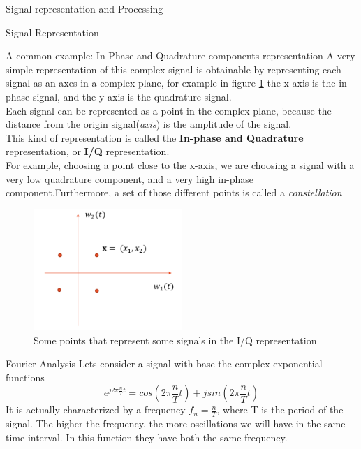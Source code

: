 \begin{section}{Signal representation and Processing}
\begin{subsection}{Signal Representation}
\begin{subsubsection}{A common example: In Phase and Quadrature components representation}
      A very simple representation of this complex signal is obtainable by representing each signal 
      as an axes in a complex plane, for example in figure \ref{fig:Complex Plane} the x-axis 
      is the in-phase signal, and the y-axis is the quadrature signal.\\
      Each signal can be represented as a point in the complex plane, because the distance from the
      origin signal(\textit{axis}) is the amplitude of the signal.\\
      This kind of representation is called the \textbf{In-phase and Quadrature} representation, or
      \textbf{I/Q} representation.\\
      For example, choosing a point close to the x-axis, we are choosing a signal with a very low
      quadrature component, and a very high in-phase component.Furthermore, a set of those 
      different points is called a \textit{constellation}\\
      \begin{figure}[h]
        \centering
        \includegraphics[width=0.5\textwidth]{img/wireless/iq representation.png}
        \caption{Some points that represent some signals in the I/Q representation}
        \label{fig:Complex Plane}
      \end{figure}
    \end{subsubsection}
  \end{subsection}
  \begin{subsection}{Fourier Analysis}
    Lets consider a signal with base the complex exponential functions 
    \begin{equation}
      e^{j2\pi \frac{n}{T} t} = cos(2\pi \frac{n}{T} t) + j sin(2\pi \frac{n}{T} t)
      \label{euler formula}
    \end{equation}
    It is actually characterized by a frequency $f_n = \frac{n}{T}$, where T is the period of the
    signal. The higher the frequency, the more oscillations we will have in the same time interval.
    In this function they have both the same frequency.\\


\end{subsection}
\end{section}
